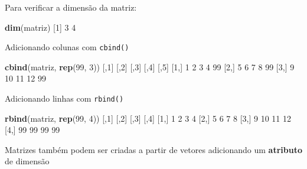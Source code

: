 \documentclass[10pt,a4paper]{book}
\newenvironment{Shaded}{\begin{snugshade}}{\end{snugshade}}
\newcommand{\KeywordTok}[1]{\textcolor[rgb]{0.13,0.29,0.53}{\textbf{#1}}}
\newcommand{\DecValTok}[1]{\textcolor[rgb]{0.00,0.00,0.81}{#1}}
\newcommand{\NormalTok}[1]{#1}
\begin{document}
Para verificar a dimensão da matriz:

\begin{Shaded}
\begin{Highlighting}[]
\KeywordTok{dim}\NormalTok{(matriz)}
\NormalTok{[}\DecValTok{1}\NormalTok{] }\DecValTok{3} \DecValTok{4}
\end{Highlighting}
\end{Shaded}

Adicionando colunas com \texttt{cbind()}

\begin{Shaded}
\begin{Highlighting}[]
\KeywordTok{cbind}\NormalTok{(matriz, }\KeywordTok{rep}\NormalTok{(}\DecValTok{99}\NormalTok{, }\DecValTok{3}\NormalTok{))}
\NormalTok{     [,}\DecValTok{1}\NormalTok{] [,}\DecValTok{2}\NormalTok{] [,}\DecValTok{3}\NormalTok{] [,}\DecValTok{4}\NormalTok{] [,}\DecValTok{5}\NormalTok{]}
\NormalTok{[}\DecValTok{1}\NormalTok{,]    }\DecValTok{1}    \DecValTok{2}    \DecValTok{3}    \DecValTok{4}   \DecValTok{99}
\NormalTok{[}\DecValTok{2}\NormalTok{,]    }\DecValTok{5}    \DecValTok{6}    \DecValTok{7}    \DecValTok{8}   \DecValTok{99}
\NormalTok{[}\DecValTok{3}\NormalTok{,]    }\DecValTok{9}   \DecValTok{10}   \DecValTok{11}   \DecValTok{12}   \DecValTok{99}
\end{Highlighting}
\end{Shaded}

Adicionando linhas com \texttt{rbind()}

\begin{Shaded}
\begin{Highlighting}[]
\KeywordTok{rbind}\NormalTok{(matriz, }\KeywordTok{rep}\NormalTok{(}\DecValTok{99}\NormalTok{, }\DecValTok{4}\NormalTok{))}
\NormalTok{     [,}\DecValTok{1}\NormalTok{] [,}\DecValTok{2}\NormalTok{] [,}\DecValTok{3}\NormalTok{] [,}\DecValTok{4}\NormalTok{]}
\NormalTok{[}\DecValTok{1}\NormalTok{,]    }\DecValTok{1}    \DecValTok{2}    \DecValTok{3}    \DecValTok{4}
\NormalTok{[}\DecValTok{2}\NormalTok{,]    }\DecValTok{5}    \DecValTok{6}    \DecValTok{7}    \DecValTok{8}
\NormalTok{[}\DecValTok{3}\NormalTok{,]    }\DecValTok{9}   \DecValTok{10}   \DecValTok{11}   \DecValTok{12}
\NormalTok{[}\DecValTok{4}\NormalTok{,]   }\DecValTok{99}   \DecValTok{99}   \DecValTok{99}   \DecValTok{99}
\end{Highlighting}
\end{Shaded}

Matrizes também podem ser criadas a partir de vetores adicionando um
\textbf{atributo} de dimensão
\end{document}
